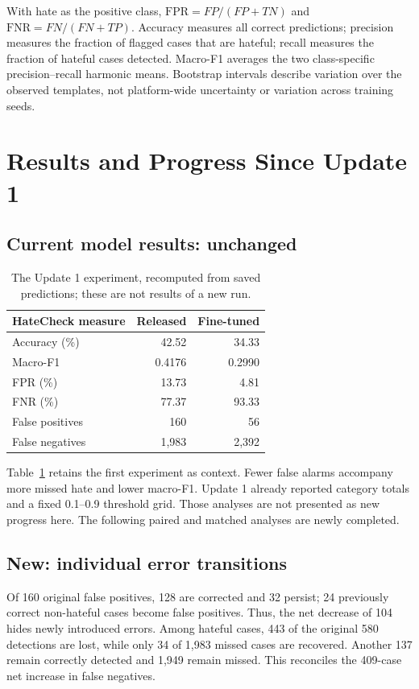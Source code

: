\documentclass[11pt]{article}
\begin{document}
With hate as the positive class, $\mathrm{FPR}=FP/(FP+TN)$ and $\mathrm{FNR}=FN/(FN+TP)$. Accuracy measures all correct predictions; precision measures the fraction of flagged cases that are hateful; recall measures the fraction of hateful cases detected. Macro-F1 averages the two class-specific precision--recall harmonic means. Bootstrap intervals describe variation over the observed templates, not platform-wide uncertainty or variation across training seeds.

\section{Results and Progress Since Update 1}
\subsection{Current model results: unchanged}
\begin{table}[t]
\centering
\small
\begin{tabular}{lrr}
\toprule
HateCheck measure & Released & Fine-tuned \\
\midrule
Accuracy (\%) & 42.52 & 34.33 \\
Macro-F1 & 0.4176 & 0.2990 \\
FPR (\%) & 13.73 & 4.81 \\
FNR (\%) & 77.37 & 93.33 \\
False positives & 160 & 56 \\
False negatives & 1,983 & 2,392 \\
\bottomrule
\end{tabular}
\caption{The Update 1 experiment, recomputed from saved predictions; these are not results of a new run.}
\label{tab:overall}
\end{table}
Table~\ref{tab:overall} retains the first experiment as context. Fewer false alarms accompany more missed hate and lower macro-F1. Update 1 already reported category totals and a fixed 0.1--0.9 threshold grid. Those analyses are not presented as new progress here. The following paired and matched analyses are newly completed.

\subsection{New: individual error transitions}
Of 160 original false positives, 128 are corrected and 32 persist; 24 previously correct non-hateful cases become false positives. Thus, the net decrease of 104 hides newly introduced errors. Among hateful cases, 443 of the original 580 detections are lost, while only 34 of 1,983 missed cases are recovered. Another 137 remain correctly detected and 1,949 remain missed. This reconciles the 409-case net increase in false negatives.
\end{document}
